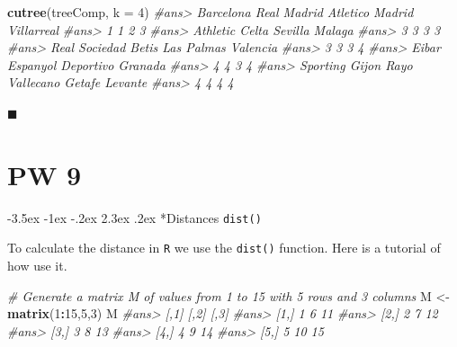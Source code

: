 \documentclass[]{book}
\makeatletter
\newenvironment{Shaded}{\begin{snugshade}}{\end{snugshade}}
\newcommand{\KeywordTok}[1]{\textcolor[rgb]{0.13,0.29,0.53}{\textbf{#1}}}
\newcommand{\DataTypeTok}[1]{\textcolor[rgb]{0.13,0.29,0.53}{#1}}
\newcommand{\DecValTok}[1]{\textcolor[rgb]{0.00,0.00,0.81}{#1}}
\newcommand{\StringTok}[1]{\textcolor[rgb]{0.31,0.60,0.02}{#1}}
\newcommand{\CommentTok}[1]{\textcolor[rgb]{0.56,0.35,0.01}{\textit{#1}}}
\newcommand{\OperatorTok}[1]{\textcolor[rgb]{0.81,0.36,0.00}{\textbf{#1}}}
\newcommand{\NormalTok}[1]{#1}
\renewcommand\section{\@startsection {section}{1}{\z@}%
                                   {-3.5ex \@plus -1ex \@minus -.2ex}%
                                   {2.3ex \@plus.2ex}%
                                   {\normalfont\Large\bfseries\color{ForestGreen}}}
\theoremstyle{definition}
\theoremstyle{definition}
\theoremstyle{definition}
\theoremstyle{remark}
\makeatother
\begin{document}
\begin{Shaded}
\begin{Highlighting}[]
\KeywordTok{cutree}\NormalTok{(treeComp, }\DataTypeTok{k =} \DecValTok{4}\NormalTok{) }
\CommentTok{#ans>       Barcelona     Real Madrid Atletico Madrid      Villarreal }
\CommentTok{#ans>               1               1               2               3 }
\CommentTok{#ans>        Athletic           Celta         Sevilla          Malaga }
\CommentTok{#ans>               3               3               3               3 }
\CommentTok{#ans>   Real Sociedad           Betis      Las Palmas        Valencia }
\CommentTok{#ans>               3               3               3               4 }
\CommentTok{#ans>           Eibar        Espanyol       Deportivo         Granada }
\CommentTok{#ans>               4               4               3               4 }
\CommentTok{#ans>  Sporting Gijon  Rayo Vallecano          Getafe         Levante }
\CommentTok{#ans>               4               4               4               4}
\end{Highlighting}
\end{Shaded}

◼

\chapter*{PW 9}\label{pw-9}

\section*{\texorpdfstring{Distances
\texttt{dist()}}{Distances dist()}}\label{distances-dist}

To calculate the distance in \texttt{R} we use the \texttt{dist()}
function. Here is a tutorial of how use it.

\begin{Shaded}
\begin{Highlighting}[]
\CommentTok{# Generate a matrix M of values from 1 to 15 with 5 rows and 3 columns}
\NormalTok{M <-}\StringTok{ }\KeywordTok{matrix}\NormalTok{(}\DecValTok{1}\OperatorTok{:}\DecValTok{15}\NormalTok{,}\DecValTok{5}\NormalTok{,}\DecValTok{3}\NormalTok{)}
\NormalTok{M}
\CommentTok{#ans>      [,1] [,2] [,3]}
\CommentTok{#ans> [1,]    1    6   11}
\CommentTok{#ans> [2,]    2    7   12}
\CommentTok{#ans> [3,]    3    8   13}
\CommentTok{#ans> [4,]    4    9   14}
\CommentTok{#ans> [5,]    5   10   15}
\end{Highlighting}
\end{Shaded}
\end{document}
